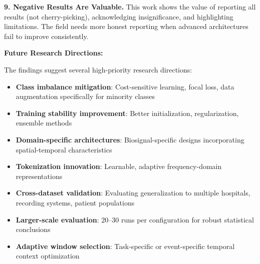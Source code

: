 \textbf{9. Negative Results Are Valuable.} This work shows the value of reporting all results (not cherry-picking), acknowledging insignificance, and highlighting limitations. The field needs more honest reporting when advanced architectures fail to improve consistently.

\textbf{Future Research Directions:}

The findings suggest several high-priority research directions:
\begin{itemize}
    \item \textbf{Class imbalance mitigation}: Cost-sensitive learning, focal loss, data augmentation specifically for minority classes
    \item \textbf{Training stability improvement}: Better initialization, regularization, ensemble methods
    \item \textbf{Domain-specific architectures}: Biosignal-specific designs incorporating spatial-temporal characteristics
    \item \textbf{Tokenization innovation}: Learnable, adaptive frequency-domain representations
    \item \textbf{Cross-dataset validation}: Evaluating generalization to multiple hospitals, recording systems, patient populations
    \item \textbf{Larger-scale evaluation}: $20$--$30$ runs per configuration for robust statistical conclusions
    \item \textbf{Adaptive window selection}: Task-specific or event-specific temporal context optimization
\end{itemize}
